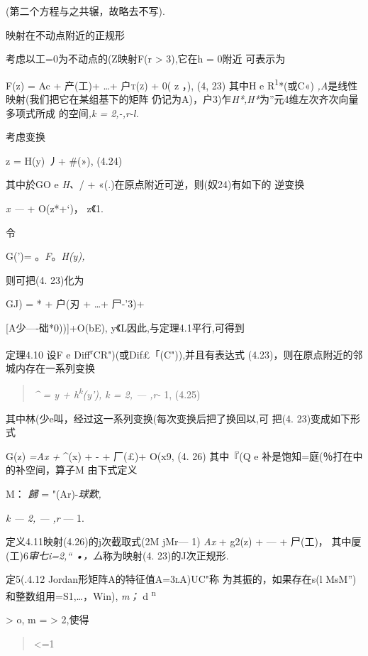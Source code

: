 \documentclass{article}
\begin{document}
(第二个方程与之共辗，故略去不写).

映射在不动点附近的正规形

考虑以工=0为不动点的(Z映射F(r \textgreater{} 3),它在h = 0附近 可表示为

F(z) = Ac + 产(工)+ \ldots{}+ 户\textsc{t(z)} + 0( \textbar{}z
\textbar{}，), (4, 23) 其中H e R\textsuperscript{1}*(或C«)
\emph{,A}是线性映射(我们把它在某组基下的矩阵
仍记为A)，户3)乍\emph{H*,H*}为''元4维左次齐次向量多项式所成
的空间\emph{,k = 2,-,r-l.}

考虑变换

z = H(y) 丿+ \#(»), (4.24)

其中於GO e \emph{H、}/ + «(.)在原点附近可逆，则(奴24)有如下的 逆变换

\emph{x ---} + O(\textbar{}z\textbar{}*+`)， \textbar{}z\textbar{}《1.

令

G(')= 。\emph{F}。\emph{H(y),}

则可把(4. 23)化为

GJ) = * + 户(刃 + \ldots{}+ 尸-'3)+

{[}A少----础*0)){]}+O(b\textbar{}E),
\textbar{}y\textbar{}《L因此,与定理4.1平行,可得到

定理4.10 设F e Diff\textsuperscript{r}CR")(或Dif£「(C")),并且有表达式
(4.23)，则在原点附近的邻城内存在一系列变换

\begin{quote}
\emph{\^{} = y + h\textsuperscript{k}(y'), k = 2, --- ,r-} 1, (4.25)
\end{quote}

其中林(少e叫，经过这一系列变换(每次变换后把了换回以,可 把(4.
23)变成如下形式

G(z) \emph{=Ax +} \^{}(x) + - + 厂(£)+ O(\textbar{}x\textbar{}9, (4. 26)
其中『(Q e 补是饱知=庭(％打在中的补空间，算子M 由下式定义

M： \emph{歸} = "(Ar)-\emph{球歎,}

\emph{k --- 2, --- ,r} --- 1. \textbar{}

定义4.11映射(4.26)的j次截取式(2M jMr--- 1) \emph{Ax} + g2(z) + --- +
尸(工)， 其中厦(工)6\emph{审七i=2,`` •，厶}称为映射(4. 23)的J次正规形.

定5(.4.12 Jordan形矩阵A的特征值\textsc{A=3lA)UC"}称
为其振的，如果存在s(l MsM'')和整数组用=S1,\ldots{}，Win), \emph{m；} d
\textsuperscript{n}

\textgreater{} o, \textbar{}m\textbar{} = \textgreater{} 2,使得

\begin{quote}
\textless{}=1
\end{quote}
\end{document}
